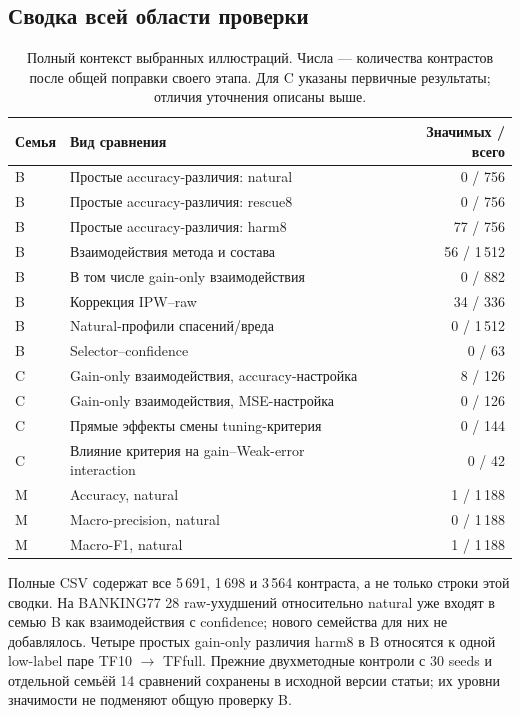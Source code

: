 \subsection{Сводка всей области проверки}
\begin{table}[htbp]\centering\small
\caption{Полный контекст выбранных иллюстраций. Числа --- количества
контрастов после общей поправки своего этапа. Для C указаны
первичные результаты; отличия уточнения описаны выше.}
\label{tab:scope_audit}
\begin{tabular}{lp{.48\linewidth}r}
\toprule
Семья & Вид сравнения & Значимых / всего \\
\midrule
B & Простые accuracy-различия: natural & 0 / 756 \\
B & Простые accuracy-различия: rescue8 & 0 / 756 \\
B & Простые accuracy-различия: harm8 & 77 / 756 \\
B & Взаимодействия метода и состава & 56 / 1\,512 \\
B & В том числе gain-only взаимодействия & 0 / 882 \\
B & Коррекция IPW--raw & 34 / 336 \\
B & Natural-профили спасений/вреда & 0 / 1\,512 \\
B & Selector--confidence & 0 / 63 \\
\midrule
C & Gain-only взаимодействия, accuracy-настройка & 8 / 126 \\
C & Gain-only взаимодействия, MSE-настройка & 0 / 126 \\
C & Прямые эффекты смены tuning-критерия & 0 / 144 \\
C & Влияние критерия на gain--Weak-error interaction & 0 / 42 \\
\midrule
M & Accuracy, natural & 1 / 1\,188 \\
M & Macro-precision, natural & 0 / 1\,188 \\
M & Macro-F1, natural & 1 / 1\,188 \\
\bottomrule
\end{tabular}
\end{table}

Полные CSV содержат все 5\,691, 1\,698 и 3\,564 контраста,
а не только строки этой сводки. На BANKING77 28 raw-ухудшений
относительно natural уже входят в семью B как взаимодействия
с confidence; нового семейства для них не добавлялось.
Четыре простых gain-only различия harm8 в B относятся к одной
low-label паре TF10 $\to$ TFfull. Прежние двухметодные контроли
с 30 seeds и отдельной семьёй 14 сравнений сохранены в исходной
версии статьи; их уровни значимости не подменяют общую проверку B.


